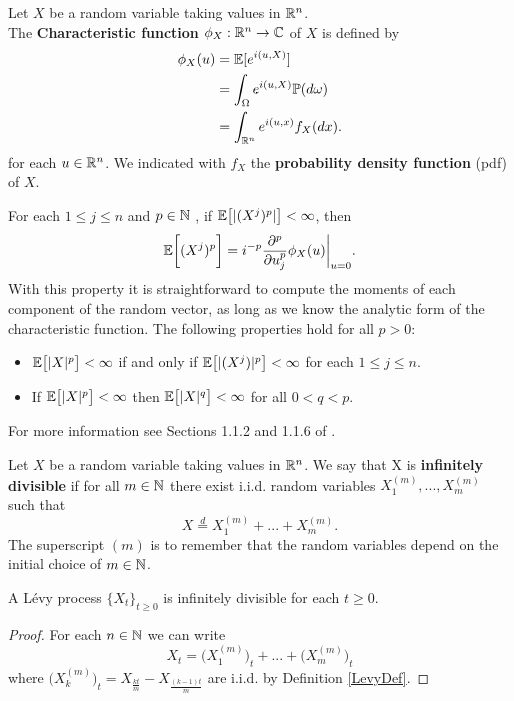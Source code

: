 \begin{Definition} \label{chf}
Let $X$ be a random variable taking values in $\mathbb{R}^n$.\\ 
The \textbf{Characteristic function} $\phi_X:\mathbb{R}^n \to \mathbb{C}$  of $X$ is defined by
\begin{align}
\phi_{X}(u) &= \mathbb{E} [e^{i(u,X)}] \nonumber \\
            &= \int_{\Omega} e^{i(u,X)} \mathbb{P}(d\omega) \nonumber \\
            &= \int_{\mathbb{R}^n} e^{i(u,x)} f_X(dx).
\end{align}
for each $u \in \mathbb{R}^n$. We indicated with $f_X$ the \textbf{probability density function} (pdf) of $X$.
\end{Definition}
For each $1 \leq j \leq n$ and $p \in \mathbb{N}$ , if $\mathbb{E}\bigl[ |(X^j)^{p}| \bigr] < \infty$, then 
\begin{equation}\label{moments}
 \mathbb{E}\biggl[ (X^j)^{p} \biggr] = i^{-p}\frac{\partial^p}{\partial u_j^{p}} \phi_X(u) \biggr|_{u=0} .
\end{equation}
With this property it is straightforward to compute the moments of each component of the random vector, as long as we know the analytic form 
of the characteristic function.
The following properties hold for all $p>0$:
\begin{itemize}
 \item $\mathbb{E} \bigl[ |X|^p \bigr] < \infty $ if and only if $\mathbb{E} \bigl[ |(X^j)|^p \bigr] < \infty $ for each $1 \leq j \leq n$. 
 \item If $\mathbb{E} \bigl[ |X|^p \bigr] < \infty $ then $\mathbb{E} \bigl[ |X|^q \bigr] < \infty $ for all $0 < q < p$.
\end{itemize}
For more information see Sections 1.1.2 and 1.1.6 of \cite{Applebaum}.
\begin{Definition}\label{inf_div}
Let $X$ be a random variable taking values in $\mathbb{R}^n$.
We say that X is \textbf{infinitely divisible} if for all $m \in \mathbb{N}$ there exist i.i.d. random variables $X_1^{(m)},...,X_m^{(m)}$
 such that
 \begin{equation}
  X \overset{d}{=} X_1^{(m)} + ... + X_m^{(m)}.
 \end{equation}
 The superscript $(m)$ is to remember that the random variables depend on the initial choice of $m\in \mathbb{N}$.
\end{Definition}

\begin{Theorem}
 A Lévy process $\{X_t\}_{t \ge 0}$ is infinitely divisible for each $t\geq0$. 
\end{Theorem}
\begin{proof}
 For each $n \in \mathbb{N}$ we can write 
 $$ X_t = \bigl( X_1^{(m)} \bigr)_t + ... + \bigl( X_m^{(m)} \bigr)_t $$
 where $ \bigl( X_k^{(m)} \bigr)_t = X_{\frac{kt}{m}} - X_{\frac{(k-1)t}{m}} $ are i.i.d. by Definition \ref{LevyDef}.
\end{proof}

